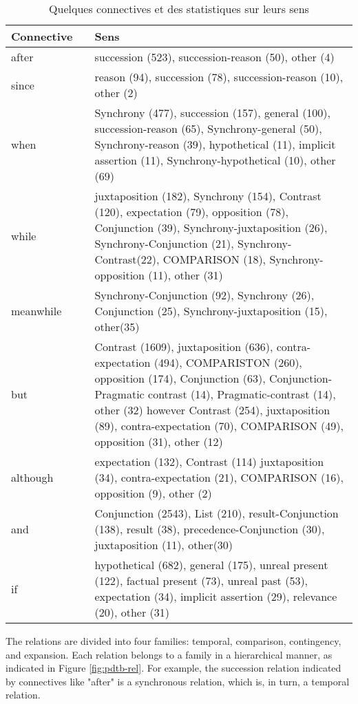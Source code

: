 \documentclass{KBook}
\begin{document}
\begin{table}[ht]
	\centering\small
	\begin{tabular}{p{}lp{}}
		\hline\hline
		\textbf{Connective} && \textbf{Sens}\\
		\hline
		
		after && succession (523), succession-reason (50), other (4) \\
		since && reason (94), succession (78), succession-reason (10), other (2) \\
		when && Synchrony (477), succession (157), general (100), succession-reason (65), Synchrony-general (50),
		Synchrony-reason (39), hypothetical (11), implicit assertion (11), Synchrony-hypothetical (10), other
		(69) \\
		while && juxtaposition (182), Synchrony (154), Contrast (120), expectation (79), opposition (78), Conjunction
		(39), Synchrony-juxtaposition (26), Synchrony-Conjunction (21), Synchrony-Contrast(22), COMPARISON (18), Synchrony-opposition (11), other (31) \\
		meanwhile && Synchrony-Conjunction (92), Synchrony (26), Conjunction (25), Synchrony-juxtaposition (15),
		other(35)\\
		but && Contrast (1609), juxtaposition (636), contra-expectation (494), COMPARISTON (260), opposition
		(174), Conjunction (63), Conjunction-Pragmatic contrast (14), Pragmatic-contrast (14), other (32)
		however Contrast (254), juxtaposition (89), contra-expectation (70), COMPARISON (49), opposition (31),
		other (12)\\
		although && expectation (132), Contrast (114) juxtaposition (34), contra-expectation (21), COMPARISON (16),
		opposition (9), other (2)\\
		and && Conjunction (2543), List (210), result-Conjunction (138), result (38), precedence-Conjunction (30),
		juxtaposition (11), other(30)\\
		if && hypothetical (682), general (175), unreal present (122), factual present (73), unreal past (53), expectation (34), implicit assertion (29), relevance (20), other (31)\\
		\hline\hline
	\end{tabular}
	\caption[Quelques connectives et des statistiques sur leurs sens]{Quelques connectives et des statistiques sur leurs sens \cite{2008-prasad-al}}
	\label{tab:pdtb-connect}
\end{table}


The  relations are divided into four families: temporal, comparison, contingency, and expansion. 
Each relation belongs to a family in a hierarchical manner, as indicated in Figure \ref{fig:pdtb-rel}. 
For example, the succession relation indicated by connectives like "after" is a synchronous relation, which is, in turn, a temporal relation.
\end{document}
